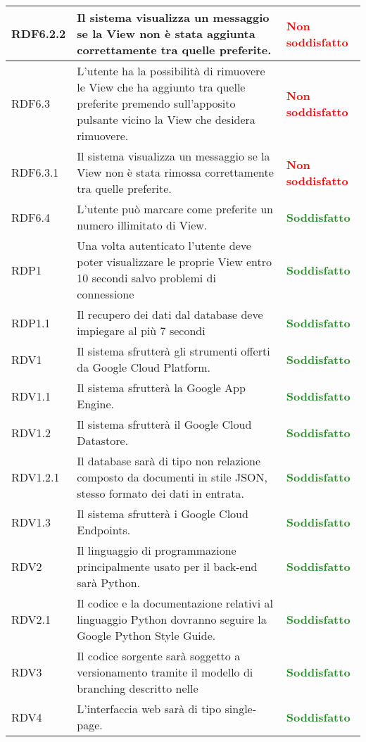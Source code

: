 \begin{center}
\begin{longtable}{| p{2.5cm} | p{8cm} | p{3.5cm} |}
		\hline
		RDF6.2.2  & Il sistema visualizza un messaggio se la View non è stata aggiunta correttamente tra quelle preferite.  & \textbf{\textcolor{red}{Non soddisfatto}} \\
		\hline
		RDF6.3  & L'utente ha la possibilità di rimuovere le View che ha aggiunto tra quelle preferite premendo sull'apposito pulsante vicino la View che desidera rimuovere.  &  \textbf{\textcolor{red}{Non soddisfatto}} \\
		\hline
		RDF6.3.1  & Il sistema visualizza un messaggio se la View non è stata rimossa correttamente tra quelle preferite.  &  \textbf{\textcolor{red}{Non soddisfatto}} \\
		\hline
		RDF6.4 & L'utente può marcare come preferite un numero illimitato di View. &  \textbf{\textcolor{forestgreen}{Soddisfatto}} \\
		\hline
		RDP1  &  Una volta autenticato l'utente deve poter visualizzare le proprie View entro 10 secondi salvo problemi di connessione &  \textbf{\textcolor{forestgreen}{Soddisfatto}} \\
		\hline
		RDP1.1  &  Il recupero dei dati dal database deve impiegare al più 7 secondi  &  \textbf{\textcolor{forestgreen}{Soddisfatto}} \\
		\hline
		RDV1  &  Il sistema sfrutterà gli strumenti offerti da Google Cloud Platform.  &  \textbf{\textcolor{forestgreen}{Soddisfatto}} \\
		\hline
		RDV1.1  &  Il sistema sfrutterà la Google App Engine.  &  \textbf{\textcolor{forestgreen}{Soddisfatto}} \\
		\hline
		RDV1.2  &  Il sistema sfrutterà il Google Cloud Datastore.  &  \textbf{\textcolor{forestgreen}{Soddisfatto}} \\
		\hline
		RDV1.2.1  &  Il database sarà di tipo non relazione composto da documenti in stile JSON, stesso formato dei dati in entrata.  &  \textbf{\textcolor{forestgreen}{Soddisfatto}} \\
		\hline
		RDV1.3  &  Il sistema sfrutterà i Google Cloud Endpoints.  &  \textbf{\textcolor{forestgreen}{Soddisfatto}} \\
		\hline
		RDV2  &  Il linguaggio di programmazione principalmente usato per il back-end sarà Python.  &  \textbf{\textcolor{forestgreen}{Soddisfatto}} \\
		\hline
		RDV2.1 & Il codice e la documentazione relativi al linguaggio Python dovranno seguire la Google Python Style Guide. & \textbf{\textcolor{forestgreen}{Soddisfatto}} \\
		\hline
		RDV3  &  Il codice sorgente sarà soggetto a versionamento tramite il modello di branching descritto nelle \docNameVersionNdP  &  \textbf{\textcolor{forestgreen}{Soddisfatto}} \\
		\hline
		RDV4  &  L'interfaccia web sarà di tipo single-page.  &  \textbf{\textcolor{forestgreen}{Soddisfatto}} \\
		\hline
		
	\end{longtable}
	\egroup
\end{center}

